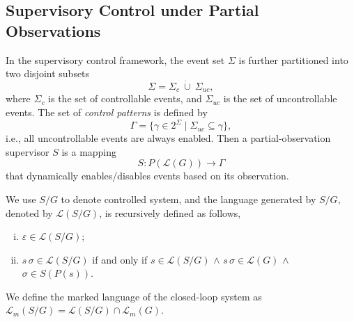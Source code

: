 \documentclass[final,5p,times,twocolumn,authoryear]{elsarticle}
\begin{document}
\subsection{Supervisory Control under Partial Observations}

In the supervisory control framework, 
the event set $\Sigma$ is further partitioned into two disjoint subsets
\[
\Sigma = \Sigma_c \ \dot{\cup} \ \Sigma_{uc},
\]
where $\Sigma_c$ is the set of controllable events, and $\Sigma_{uc}$ is the set of uncontrollable events. 
The set of \emph{control patterns} is defined by 
\[
\Gamma=\{\gamma\in 2^\Sigma \mid \Sigma_{uc}\subseteq \gamma \}, 
\]
i.e., all uncontrollable events are always enabled. 
Then a partial-observation supervisor $S$ is a mapping 
\[
S : P(\mathcal{L}(G)) \to  \Gamma
\]
that dynamically enables/disables events based on its observation. 

We use $S / G$ to denote controlled system, and the language generated by $S /G$, denoted by $\mathcal{L}(S / G)$, is recursively defined as follows,
\begin{enumerate}[(i)]
    \item $\varepsilon \in \mathcal{L}(S / G)$;
    \item $s \, \sigma \in \mathcal{L}(S / G)$ if and only if
    $s \in \mathcal{L}(S / G)$ $\wedge$ $s \, \sigma \in \mathcal{L}(G)$ $\wedge$ $\sigma \in S(P(s))$.
\end{enumerate}
We define the marked language of the closed-loop system  as $\mathcal{L}_m(S / G) = \mathcal{L}(S / G) \cap \mathcal{L}_m(G)$.
\end{document}
